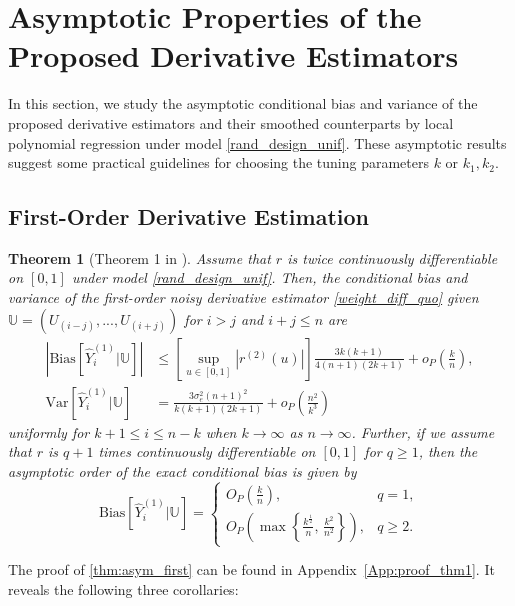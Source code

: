 \documentclass{uwstat572}
\newtheorem{theorem}{Theorem}
\theoremstyle{definition}
\renewcommand{\hat}{\widehat}
\theoremstyle{theorem}
\begin{document}
\section{Asymptotic Properties of the Proposed Derivative Estimators}
\label{Sec:asymp_res}

In this section, we study the asymptotic conditional bias and variance of the proposed derivative estimators and their smoothed counterparts by local polynomial regression under model \eqref{rand_design_unif}. These asymptotic results suggest some practical guidelines for choosing the tuning parameters $k$ or $k_1,k_2$.

\subsection{First-Order Derivative Estimation}
\label{Sec:first_asymp}

\begin{theorem}[Theorem 1 in \citealt{liu2020smoothed}]
\label{thm:asym_first}
Assume that $r$ is twice continuously differentiable on $[0,1]$ under model \eqref{rand_design_unif}. Then, the conditional bias and variance of the first-order noisy derivative estimator \eqref{weight_diff_quo} given $\mathbb{U} = \left(U_{(i-j)},...,U_{(i+j)}\right)$ for $i>j$ and $i+j\leq n$ are 
\begin{align*}
\left|\mathrm{Bias}\left[\hat{Y}_i^{(1)} \big| \mathbb{U}\right] \right| &\leq \left[\sup_{u\in [0,1]} \left|r^{(2)}(u)\right|\right] \frac{3k(k+1)}{4(n+1)(2k+1)} + o_P\left(\frac{k}{n}\right),\\
\mathrm{Var}\left[\hat{Y}_i^{(1)} \big| \mathbb{U}\right] &= \frac{3\sigma_e^2 (n+1)^2}{k(k+1)(2k+1)} + o_P\left(\frac{n^2}{k^3}\right)
\end{align*}
uniformly for $k+1\leq i\leq n-k$ when $k\to \infty$ as $n\to \infty$. Further, if we assume that $r$ is $q+1$ times continuously differentiable on $[0,1]$ for $q\geq 1$, then the asymptotic order of the exact conditional bias is given by
\[
\mathrm{Bias}\left[\hat{Y}_i^{(1)} \big| \mathbb{U}\right]=
\begin{cases}
O_P\left(\frac{k}{n}\right), & q=1,\\
O_P\left(\max\left\{\frac{k^{\frac{1}{2}}}{n},\, \frac{k^2}{n^2}\right\}\right), & q\geq 2.
\end{cases}
\]
\end{theorem}

\noindent The proof of \autoref{thm:asym_first} can be found in Appendix~\ref{App:proof_thm1}. It reveals the following three corollaries:
\end{document}
